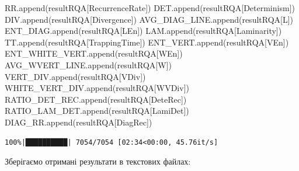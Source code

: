 \documentclass[
  letterpaper,
]{report}
\newenvironment{Shaded}{\begin{snugshade}}{\end{snugshade}}
\newcommand{\NormalTok}[1]{\textcolor[rgb]{0.00,0.23,0.31}{#1}}
\newcommand{\StringTok}[1]{\textcolor[rgb]{0.13,0.47,0.30}{#1}}
\begin{document}
\begin{Shaded}
\begin{Highlighting}[]
\NormalTok{    RR.append(resultRQA[}\StringTok{\textquotesingle{}RecurrenceRate\textquotesingle{}}\NormalTok{])}
\NormalTok{    DET.append(resultRQA[}\StringTok{\textquotesingle{}Determinism\textquotesingle{}}\NormalTok{])}
\NormalTok{    DIV.append(resultRQA[}\StringTok{\textquotesingle{}Divergence\textquotesingle{}}\NormalTok{]) }
\NormalTok{    AVG\_DIAG\_LINE.append(resultRQA[}\StringTok{\textquotesingle{}L\textquotesingle{}}\NormalTok{])}
\NormalTok{    ENT\_DIAG.append(resultRQA[}\StringTok{\textquotesingle{}LEn\textquotesingle{}}\NormalTok{])}
\NormalTok{    LAM.append(resultRQA[}\StringTok{\textquotesingle{}Laminarity\textquotesingle{}}\NormalTok{]) }
\NormalTok{    TT.append(resultRQA[}\StringTok{\textquotesingle{}TrappingTime\textquotesingle{}}\NormalTok{]) }
\NormalTok{    ENT\_VERT.append(resultRQA[}\StringTok{\textquotesingle{}VEn\textquotesingle{}}\NormalTok{])}
\NormalTok{    ENT\_WHITE\_VERT.append(resultRQA[}\StringTok{\textquotesingle{}WEn\textquotesingle{}}\NormalTok{])}
\NormalTok{    AVG\_WVERT\_LINE.append(resultRQA[}\StringTok{\textquotesingle{}W\textquotesingle{}}\NormalTok{]) }
\NormalTok{    VERT\_DIV.append(resultRQA[}\StringTok{\textquotesingle{}VDiv\textquotesingle{}}\NormalTok{])}
\NormalTok{    WHITE\_VERT\_DIV.append(resultRQA[}\StringTok{\textquotesingle{}WVDiv\textquotesingle{}}\NormalTok{])}
\NormalTok{    RATIO\_DET\_REC.append(resultRQA[}\StringTok{\textquotesingle{}DeteRec\textquotesingle{}}\NormalTok{]) }
\NormalTok{    RATIO\_LAM\_DET.append(resultRQA[}\StringTok{\textquotesingle{}LamiDet\textquotesingle{}}\NormalTok{])}
\NormalTok{    DIAG\_RR.append(resultRQA[}\StringTok{\textquotesingle{}DiagRec\textquotesingle{}}\NormalTok{])}
\end{Highlighting}
\end{Shaded}

\begin{verbatim}
100%|██████████| 7054/7054 [02:34<00:00, 45.76it/s]
\end{verbatim}

Зберігаємо отримані результати в текстових файлах:
\end{document}
